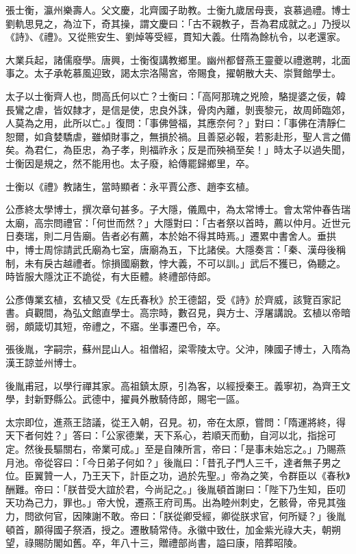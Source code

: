 \begin{pinyinscope}
 張士衡，瀛州樂壽人。父文慶，北齊國子助教。士衡九歲居母喪，哀慕過禮。博士劉軌思見之，為泣下，奇其操，謂文慶曰：「古不親教子，吾為君成就之。」乃授以《詩》、《禮》。又從熊安生、劉焯等受經，貫知大義。仕隋為餘杭令，以老還家。



 大業兵起，諸儒廢學。唐興，士衡復講教鄉里。幽州都督燕王靈夔以禮邀聘，北面事之。太子承乾慕風迎致，謁太宗洛陽宮，帝賜食，擢朝散大夫、崇賢館學士。



 太子以士衡齊人也，問高氏何以亡？士衡曰：「高阿那瑰之兇險，駱提婆之佞，韓長鸞之虐，皆奴隸才，是信是使，忠良外誅，骨肉內離，剝喪黎元，故周師臨郊，人莫為之用，此所以亡。」復問：「事佛營福，其應奈何？」對曰：「事佛在清靜仁恕爾，如貪婪驕虐，雖傾財事之，無損於禍。且善惡必報，若影赴形，聖人言之備矣。為君仁，為臣忠，為子孝，則福祚永；反是而殃禍至矣！」時太子以過失聞，士衡因是規之，然不能用也。太子廢，給傳罷歸鄉里，卒。



 士衡以《禮》教諸生，當時顯者：永平賈公彥、趙李玄植。



 公彥終太學博士，撰次章句甚多。子大隱，儀鳳中，為太常博士。會太常仲春告瑞太廟，高宗問禮官：「何世而然？」大隱對曰：「古者祭以首時，薦以仲月。近世元日奏瑞，則二月告廟。告者必有薦，本於始不得其時焉。」遷累中書舍人。垂拱中，博士周悰請武氏廟為七室，唐廟為五，下比諸侯。大隱奏言：「秦、漢母後稱制，未有戾古越禮者。悰損國廟數，悖大義，不可以訓。」武后不獲已，偽聽之。時皆服大隱沈正不詭從，有大臣體。終禮部侍郎。



 公彥傳業玄植，玄植又受《左氏春秋》於王德韶，受《詩》於齊威，該覽百家記書。貞觀間，為弘文館直學士。高宗時，數召見，與方士、浮屠講說。玄植以帝暗弱，頗箴切其短，帝禮之，不寤。坐事遷巴令，卒。



 張後胤，字嗣宗，蘇州昆山人。祖僧紹，梁零陵太守。父沖，陳國子博士，入隋為漢王諒並州博士。



 後胤甫冠，以學行禪其家。高祖鎮太原，引為客，以經授秦王。義寧初，為齊王文學，封新野縣公。武德中，擢員外散騎侍郎，賜宅一區。



 太宗即位，進燕王諮議，從王入朝，召見。初，帝在太原，嘗問：「隋運將終，得天下者何姓？」答曰：「公家德業，天下系心，若順天而動，自河以北，指捴可定。然後長驅關右，帝業可成。」至是自陳所言，帝曰：「是事未始忘之。」乃賜燕月池。帝從容曰：「今日弟子何如？」後胤曰：「昔孔子門人三千，達者無子男之位。臣翼贊一人，乃王天下，計臣之功，過於先聖。」帝為之笑，令群臣以《春秋》酬難。帝曰：「朕昔受大誼於君，今尚記之。」後胤頓首謝曰：「陛下乃生知，臣叨天功為己力，罪也。」帝大悅，遷燕王府司馬。出為睦州刺史，乞骸骨，帝見其強力，問欲何官，因陳謝不敢。帝曰：「朕從卿受經，卿從朕求官，何所疑？」後胤頓首，願得國子祭酒，授之。遷散騎常侍。永徽中致仕，加金紫光祿大夫，朝朔望，祿賜防閣如舊。卒，年八十三，贈禮部尚書，謚曰康，陪葬昭陵。




\end{pinyinscope}
